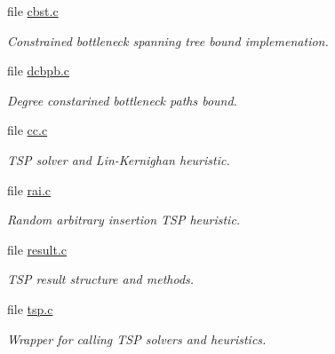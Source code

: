 \begin{CompactItemize}
\item 
file \hyperlink{lib_2lb_2cbst_8c}{cbst.c}
\begin{CompactList}\small\item\em Constrained bottleneck spanning tree bound implemenation. \item\end{CompactList}

\item 
file \hyperlink{lib_2lb_2dcbpb_8c}{dcbpb.c}
\begin{CompactList}\small\item\em Degree constarined bottleneck paths bound. \item\end{CompactList}

\item 
file \hyperlink{cc_8c}{cc.c}
\begin{CompactList}\small\item\em TSP solver and Lin-Kernighan heuristic. \item\end{CompactList}

\item 
file \hyperlink{rai_8c}{rai.c}
\begin{CompactList}\small\item\em Random arbitrary insertion TSP heuristic. \item\end{CompactList}

\item 
file \hyperlink{tsp_2result_8c}{result.c}
\begin{CompactList}\small\item\em TSP result structure and methods. \item\end{CompactList}

\item 
file \hyperlink{lib_2tsp_2tsp_8c}{tsp.c}
\begin{CompactList}\small\item\em Wrapper for calling TSP solvers and heuristics. \item\end{CompactList}

\end{CompactItemize}
